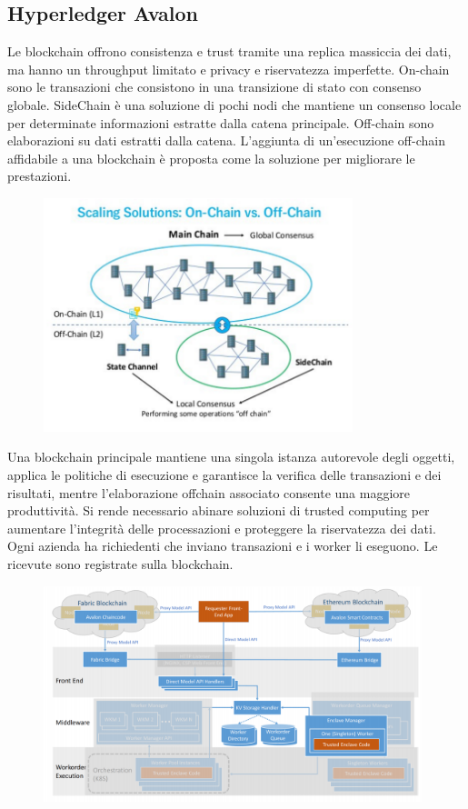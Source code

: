 \subsection{Hyperledger Avalon}

Le blockchain offrono consistenza e trust tramite una replica
massiccia dei dati, ma hanno un throughput limitato e privacy e
riservatezza imperfette.
On-chain sono le transazioni che
consistono in una transizione di stato
con consenso globale.
SideChain è una soluzione di pochi nodi
che mantiene un consenso locale per
determinate informazioni estratte dalla
catena principale.
Off-chain sono elaborazioni su dati
estratti dalla catena.
L’aggiunta di un'esecuzione off-chain affidabile a una blockchain è
proposta come la soluzione per migliorare le prestazioni.

\begin{figure}[htb!]
    \centering
    \includegraphics[width=9cm]{./Images/cap6/6.11.png}
\end{figure}


Una blockchain principale mantiene una singola istanza autorevole
degli oggetti, applica le politiche di esecuzione e garantisce la
verifica delle transazioni e dei risultati, mentre l’elaborazione offchain associato consente una maggiore produttività. Si rende
necessario abinare soluzioni di trusted computing per aumentare
l'integrità delle processazioni e proteggere la riservatezza dei dati.
Ogni azienda ha richiedenti che inviano transazioni e i worker li
eseguono. Le ricevute
sono registrate sulla
blockchain.

\begin{figure}[htb!]
    \centering
    \includegraphics[width=11cm]{./Images/cap6/6.12.png}
\end{figure}

